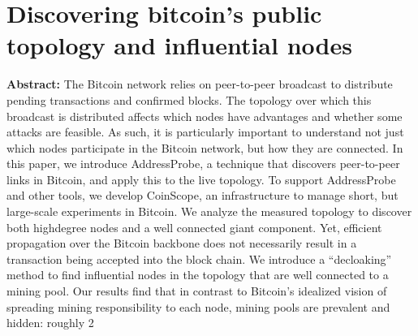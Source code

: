 \section{Discovering bitcoin's public topology and influential nodes }

\textbf{Abstract:} 
The  Bitcoin  network  relies  on  peer-to-peer  broadcast to distribute pending transactions and confirmed blocks. The topology over which this broadcast is distributed affects which nodes have advantages and whether some attacks are feasible.  As such, it is particularly important to understand not just which nodes participate in the Bitcoin network, but how they are connected. In this paper, we introduce AddressProbe, a technique that  discovers  peer-to-peer  links  in  Bitcoin,  and  apply this to the live topology.  To support AddressProbe and other tools, we develop CoinScope, an infrastructure to manage short, but large-scale experiments in Bitcoin. We analyze  the  measured  topology  to  discover  both  highdegree nodes and a well connected giant component. Yet, efficient propagation over the Bitcoin backbone does not necessarily result in a transaction being accepted into the block chain. We introduce a “decloaking” method to find influential nodes in the topology that are well connected to a mining pool. Our results find that in contrast to Bitcoin’s idealized vision of spreading mining responsibility to each node, mining pools are prevalent and hidden: roughly  2%

